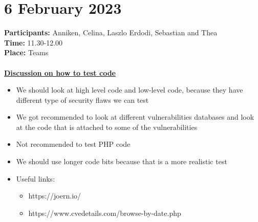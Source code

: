\section{6 February 2023}
\textbf{Participants:} Anniken, Celina, Laszlo Erdodi, Sebastian and Thea \\
\textbf{Time:} 11.30-12.00 \\
\textbf{Place:} Teams
\\~\\
\textbf{\underline{Discussion on how to test code}}
\begin{itemize}
    \item We should look at high level code and low-level code, because they have different type of security flaws we can test
    \item We got recommended to look at different vulnerabilities databases and look at the code that is attached to some of the vulnerabilities
    \item Not recommended to test PHP code
    \item We should use longer code bits because that is a more realistic test
    \item Useful links: 
        \begin{itemize}
            \item https://joern.io/ 
            \item https://www.cvedetails.com/browse-by-date.php 
        \end{itemize}
\end{itemize}
